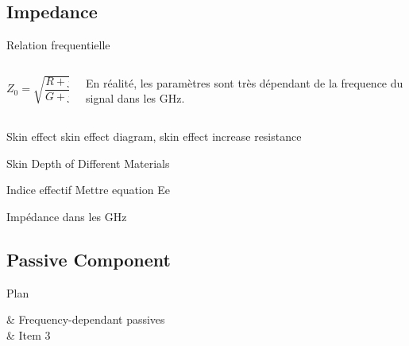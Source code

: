 \subsection[6min-Max]{Impedance }
\maxbackground


\begin{frame}{Relation frequentielle}
    \begin{columns}
        \begin{column}{0.33\textwidth}
            \begin{center}
            $Z_0 = \sqrt{\dfrac{R + j \omega L}{G + j \omega C}}$\\
            \end{center}
        \end{column}
        \begin{column}{0.66\textwidth}
            En réalité, les paramètres sont très dépendant de la frequence du signal dans les GHz.
        \end{column}
    \end{columns}
    \vspace{30pt}
\end{frame}

\begin{frame}{Skin effect}
    skin effect diagram, skin effect increase resistance
\end{frame}

\begin{frame}{Skin Depth of Different Materials}

\end{frame}

\begin{frame}{Indice effectif}
    Mettre equation Ee
\end{frame}

\begin{frame}{Impédance dans les GHz}
\end{frame}




\subsection[5min-Pascal]{Passive Component }
\pascalbackground
\begin{frame}{Plan}
    \begin{makelist}[\small][1.5]
        \icon[red]{\faTimes} & Frequency-dependant passives\\
        \icon[red]{\faTimes} & Item 3
    \end{makelist}
\end{frame}




